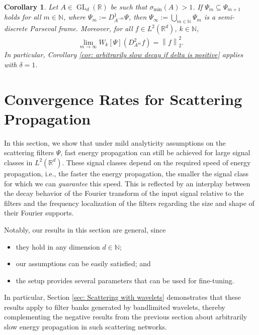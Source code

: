 \documentclass[11pt]{amsart}
\newcommand{\R}{{\mathbb{R}}}
\newcommand{\N}{\mathbb{N}}
\newcommand{\norm}[1]{\ensuremath{\left\lVert\text{}#1\text{}\right\rVert}}
\DeclareMathOperator{\GL}{GL}
\newtheorem{corollary}[theorem]{Corollary}
\newenvironment{proof sketch} {\textit{Proof sketch.}}{}
\begin{document}
  \begin{corollary}\label{cor: slow propagation in case of a single expansive matrix}
    Let $A \in \GL_d(\R)$ be such that $\sigma_{\min}(A)>1$. If $\Psi_{m} \subseteq \Psi_{m+1}$ holds for all $m \in \N$, where $\Psi_m:=D_{A^{-m}}^1\Psi$, then $\Psi_\infty:=\bigcup_{m \in \N} \Psi_m$ is a semi-discrete Parseval frame. Moreover, for all $f \in L^2(\R^d)$, $k \in \N$,
    \begin{align*}
      \lim_{m \to \infty} W_k[\Psi]\left(D_{A^m}^2f\right)=\norm{f}_2^2.
    \end{align*}
    In particular, Corollary \ref{cor: arbitrarily slow decay if delta is positive} applies with $\delta=1$.
  \end{corollary}
  
  \section{Convergence Rates for Scattering Propagation}\label{sec: Convergence rates for scattering propagation}
  
  In this section, we show that under mild analyticity assumptions on the scattering filters $\Psi$, fast energy propagation can still be achieved for large signal classes in $L^2(\R^d)$. These signal classes depend on the required speed of energy propagation, i.e., the faster the energy propagation, the smaller the signal class for which we can \textit{guarantee} this speed. This is reflected by an interplay between the decay behavior of the Fourier transform of the input signal relative to the filters and the frequency localization of the filters regarding the size and shape of their Fourier supports.
    
  Notably, our results in this section are general, since
  \begin{itemize}
    \item they hold in any dimension $d \in \N$;
    \item our assumptions can be easily satisfied; and
    \item the setup provides several parameters that can be used for fine-tuning.
  \end{itemize}
  In particular, Section \ref{sec: Scattering with wavelets} demonstrates that these results apply to filter banks generated by bandlimited wavelets, thereby complementing the negative results from the previous section about arbitrarily slow energy propagation in such scattering networks.
   
\end{document}
